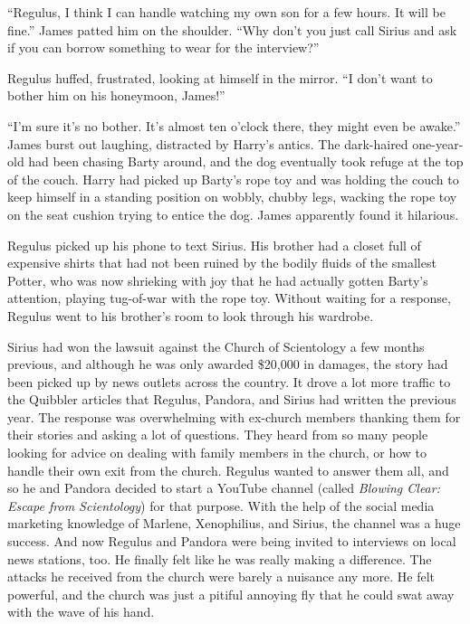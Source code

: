 \documentclass[12pt,twoside,openright]{memoir}
\begin{document}
``Regulus, I think I can handle watching my own son for a few hours. It will be fine.'' James patted him on the shoulder.
``Why don't you just call Sirius and ask if you can borrow something to wear for the interview?''

Regulus huffed, frustrated, looking at himself in the mirror. ``I don't want to bother him on his honeymoon, James!''

``I'm sure it's no bother. It's almost ten o'clock there, they might even be awake.'' James burst out laughing, distracted by Harry's antics. The dark-haired one-year-old had been chasing Barty around, and the dog eventually took refuge at the top of the couch. Harry had picked up Barty's rope toy and was holding the couch to keep himself in a standing position on wobbly, chubby legs, wacking the rope toy on the seat cushion trying to entice the dog. James apparently found it hilarious. 

Regulus picked up his phone to text Sirius. His brother had a closet full of expensive shirts that had not been ruined by the bodily fluids of the smallest Potter, who was now shrieking with joy that he had actually gotten Barty's attention, playing tug-of-war with the rope toy. Without waiting for a response, Regulus went to his brother's room to look through his wardrobe. 

Sirius had won the lawsuit against the Church of Scientology a few months previous, and although he was only awarded
\$20,000 in damages, the story had been picked up by news outlets across the country. It drove a lot more traffic to the Quibbler articles that Regulus, Pandora, and Sirius had written the previous year. The response was overwhelming with ex-church members thanking them for their stories and asking a lot of questions. They heard from so many people looking for advice on dealing with family members in the church, or how to handle their own exit from the church. Regulus wanted to answer them all, and so he and Pandora decided to start a YouTube channel (called
\textit{Blowing Clear: Escape from Scientology}) for that purpose. With the help of the social media marketing knowledge of Marlene, Xenophilius, and Sirius, the channel was a huge success. And now Regulus and Pandora were being invited to interviews on local news stations, too. He finally felt like he was really making a difference. The attacks he received from the church were barely a nuisance any more. He felt powerful, and the church was just a pitiful annoying fly that he could swat away with the wave of his hand.
\end{document}
